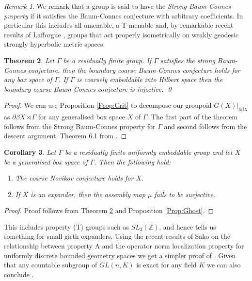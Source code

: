 \documentclass[11pt]{amsart}
\theoremstyle{plain}
\newtheorem{theorem}{Theorem}%
\newtheorem{corollary}[theorem]{Corollary}%
\theoremstyle{definition}%
\theoremstyle{remark}%
\newtheorem{remark}[theorem]{Remark}%
\begin{document}
\begin{remark}
We remark that a group is said to have the \textit{Strong Baum-Connes property} if it satisfies the Baum-Connes conjecture with arbitrary coefficients. In particular this includes all amenable, a-T-menable \cite{MR1487204} and, by remarkable recent results of Lafforgue \cite{lafforgue2012}, groups that act properly isometrically on weakly geodesic strongly hyperbolic metric spaces.
\end{remark}

\begin{theorem}\label{Thm:GBS}
Let $\Gamma$ be a residually finite group. If $\Gamma$ satisfies the strong Baum-Connes conjecture, then the boundary coarse Baum-Connes conjecture holds for any box space of $\Gamma$. If $\Gamma$ is coarsely embeddable into Hilbert space then the boundary coarse Baum-Connes conjecture is injective. \qed
\end{theorem}
\begin{proof}
We can use Proposition \ref{Prop:Crit} to decompose our groupoid $G(X)|_{\partial \beta X}$ as $\partial\beta X \rtimes \Gamma$ for any generalised box space $X$ of $\Gamma$. The first part of the theorem follows from the Strong Baum-Connes property for $\Gamma$ and second follows from the descent argument, Theorem 6.1 from \cite{MR1905840}. 
\end{proof}

\begin{corollary}
Let $\Gamma$ be a residually finite uniformly embeddable group and let $X$ be a generalised box space of $\Gamma$. Then the following hold:
\begin{enumerate}
\item The coarse Novikov conjecture holds for $X$.
\item If $X$ is an expander, then the assembly map $\mu$ fails to be surjective.
\end{enumerate}
\end{corollary}
\begin{proof}
Proof follows from Theorem \ref{Thm:GBS} and Proposition \ref{Prop:Ghost}.
\end{proof}
This includes property (T) groups such as $SL_{3}(\mathbb{Z})$, and hence tells us something for small girth expanders. Using the recent results of Sako on the relationship between property A and the operator norm localization property for uniformly discrete bounded geometry spaces \cite{AONL-2012} we get a simpler proof of \cite[Theorem 7.1]{MR2419930}. Given that any countable subgroup of $GL(n,K)$ is exact for any field $K$ \cite{MR2217050} we can also conclude \cite[Theorem 5.3]{MR2764895}.
\end{document}
